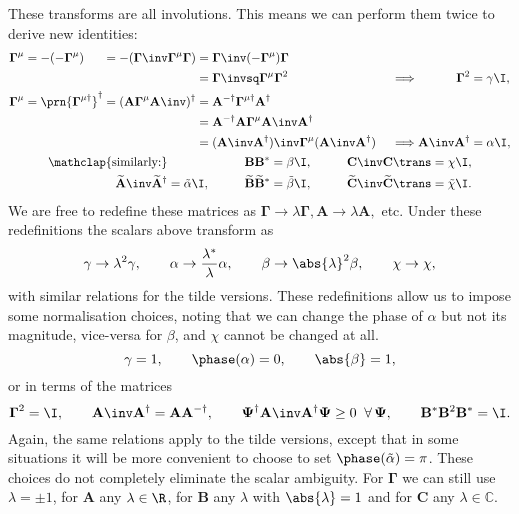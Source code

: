 \documentclass[11pt]{article}
\newcommand{\invd}{^{-\dag}}
\newcommand{\Gammab}{\boldsymbol{\Gamma}}
\newcommand{\Gammap}[1][\mu]{\prn{\Gammab^{#1}}}
\newcommand{\mud}{{\mu\dag}}
\newcommand{\A}{\mathbf{A}}
\newcommand{\B}{\mathbf{B}}
\renewcommand{\C}{\mathbf{C}}
\newcommand{\At}{\widetilde{\A}}
\newcommand{\Bt}{\widetilde{\B}}
\newcommand{\Ct}{\widetilde{\C}}
\newcommand{\Cb}{\mathbb{C}}
\newcommand{\Psib}{\boldsymbol{\Psi}}
\newcommand{\alphat}{\tilde{\alpha}}
\newcommand{\betat}{\tilde{\beta}}
\newcommand{\chit}{\tilde{\chi}}
\begin{document}
These transforms are all involutions.
This means we can perform them twice to derive new identities:
%
\begin{equation*}
\begin{gathered}
\begin{alignedat}{5}
  \Gammab^\mu &= -(-\Gammab^\mu) &
        &= -(\Gammab\inv \Gammab^\mu \Gammab) &
        &= \Gammab\inv (-\Gammab^\mu) \Gammab \\ && &&
        &= \Gammab\invsq \Gammab^\mu \Gammab^2 &\quad
  &\implies &
  \Gammab^2 &= \gamma \I, \\
  \Gammab^\mu &= \Gammap[\mud]^\dag &
        &= (\A \Gammab^\mu \A\inv)^\dag &
        &= \A\invd \Gammab^\mud \A^\dag \\ && &&
        &= \A\invd \A \Gammab^\mu \A\inv \A^\dag \\ && &&
        &= (\A\inv \A^\dag)\inv \Gammab^\mu (\A\inv \A^\dag) &
  &\implies &
  \A\inv \A^\dag &= \alpha \I,
\end{alignedat} \\
\begin{aligned}
  \mathclap{\text{similarly:}} &&\qquad
  \B \B^\ast &= \beta \I, &\qquad
  \C\inv \C\trans &= \chi \I, \\
  \At\inv \At^\dag &= \alphat \I, &
  \Bt \Bt^\ast &= \betat \I, &
  \Ct\inv \Ct\trans &= \chit \I.
\end{aligned}
\end{gathered}
\end{equation*}
%
We are free to redefine these matrices as $\Gammab \rightarrow \lambda \Gammab, \A \rightarrow \lambda \A,$ etc.
Under these redefinitions the scalars above transform as
%
\begin{equation*}
  \gamma \rightarrow \lambda^2 \gamma, \qquad
  \alpha \rightarrow \frac{\lambda^\ast}{\lambda} \alpha, \qquad
  \beta \rightarrow \abs{\lambda}^2 \beta, \qquad
  \chi \rightarrow \chi,
\end{equation*}
%
with similar relations for the tilde versions.
These redefinitions allow us to impose some normalisation choices, noting that we can change the phase of $\alpha$ but not its magnitude, vice-versa for $\beta$, and $\chi$ cannot be changed at all.
%
\begin{equation}\label{eq:normscalar}
  \gamma = 1, \qquad
  \phase(\alpha) = 0, \qquad
  \abs{\beta} = 1,
\end{equation}
%
or in terms of the matrices
%
\begin{equation}\label{eq:normmats}
  \Gammab^2 = \I, \qquad
  \A\inv \A^\dag = \A \A\invd, \qquad
  \Psib^\dag \A\inv \A^\dag \Psib \geq 0 \;\; \forall \, \Psib, \qquad
  \B^\ast \B^2 \B^\ast = \I.
\end{equation}
%
Again, the same relations apply to the tilde versions, except that in some situations it will be more convenient to choose to set \( \phase(\alphat) = \pi \).
These choices do not completely eliminate the scalar ambiguity.
For $\Gammab$ we can still use $\lambda = \pm 1$, for $\A$ any $\lambda \in \R$, for $\B$ any $\lambda$ with $\abs{\lambda} = 1$ and for $\C$ any $\lambda \in \Cb$.
\end{document}
